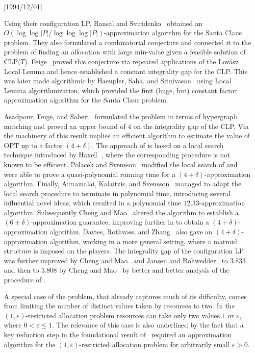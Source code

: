 \NeedsTeXFormat{LaTeX2e}[1994/12/01]\documentclass[letterpaper, 11pt]{article}
\theoremstyle{definition}
\theoremstyle{remark}
\numberwithin{equation}{section}
\begin{document}
Using their configuration LP, Bansal and
Sviridenko~\cite{bansalsviridenko} obtained an
$O(\log \log |P|/ \log\log\log |P|)$-approximation algorithm
for the Santa Claus problem. They also formulated a combinatorial
conjecture and connected it
to the problem of finding an allocation with large min-value given a
feasible solution of CLP($T$).  Feige~\cite{feige} proved this
conjecture via repeated applications of the
Lov\'asz Local Lemma and hence established a constant 
integrality gap for the CLP. This was later made algorithmic by Haeupler,
Saha, and Srinivasan~\cite{haeupsahasrin} using Local Lemma
algorithmization, which provided the first
(huge, but) constant factor approximation algorithm for
the Santa Claus problem.

Asadpour, Feige, and Saberi~\cite{asadpourfeigesaberi} formulated the
problem in terms of hypergraph matching and proved an upper bound of
$4$ on the integrality gap of the CLP.
Via the machinery of \cite{bansalsviridenko} this result implies an efficient algorithm to estimate the value
of OPT up to a factor $(4+\delta)$. 
The approach of \cite{asadpourfeigesaberi} is based on a local search
technique introduced by Haxell~\cite{haxell}, where the corresponding procedure is not
known to be efficient. Polacek and Svensson~\cite{polaceksvensson}
modified the local search of \cite{asadpourfeigesaberi} and were able
to prove a quasi-polynomial running time for a
$(4+\delta)$-approximation algorithm. Finally, Annamalai, Kalaitzis, and
Svensson~\cite{annakalasven} managed to adapt the local search 
procedure to terminate in polynomial time, introducing several influential
novel ideas, which resulted in a polynomial time $12.33$-approximation algorithm. 
Subsequently Cheng and Mao~\cite{chengmao18} altered the algorithm
to establish a $(6+\delta)$-approximation guarantee, improving further
in \cite{chengmao19} to obtain a $(4+\delta)$-approximation
algorithm. Davies, Rothvoss, and Zhang~\cite{daviesrothvosszhang} also
gave an $(4+\delta)$-approximation algorithm, working in a more general setting, where
a matroid structure is imposed on the players.
The integrality gap of the configuration LP was further improved by
Cheng and Mao~\cite{chengmao18b} and Jansen and
Rohwedder~\cite{jansenrohwedder} to 3.833 and then to 3.808 by Cheng
and Mao~\cite{chengmao19} by better and better analysis of the
procedure of \cite{asadpourfeigesaberi}. 

A special case of the problem, that already captures much of its
difficulty, comes from limiting the number of distinct values taken by
resources to two. In the $(1,\varepsilon)$-restricted allocation problem
resources can take only two values $1$ or $\varepsilon$, where
$0 < \varepsilon \leq 1$. The relevance of this case is also underlined
by the fact that a key reduction step in the foundational result of~\cite{bansalsviridenko} 
required an approximation algorithm for the $(1,\varepsilon)$-restricted
allocation problem for arbitrarily small $\varepsilon >0$.
\end{document}
